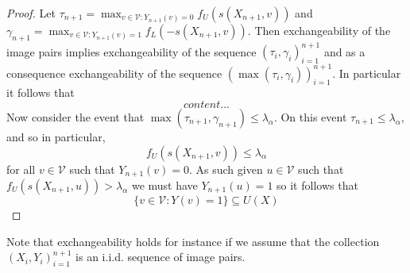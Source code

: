 \begin{proof}
	Let $\tau_{n+1}= \max_{v \in \mathcal{V}: Y_{n+1}(v) = 0} f_U(s(X_{n+1},v))$ and $\gamma_{n+1} = \max_{v \in \mathcal{V}: Y_{n+1}(v) = 1} f_L(-s(X_{n+1},v))$. Then exchangeability of the image pairs implies exchangeability of the sequence $(\tau_i, \gamma_i)_{i = 1}^{n+1}$ and as a consequence exchangeability of the sequence $(\max(\tau_i, \gamma_i))_{i = 1}^{n+1}$. 
	In particular it follows that 
	\begin{equation*}
		content...
	\end{equation*}
	Now consider the event that $\max(\tau_{n+1}, \gamma_{n+1}) \leq \lambda_{\alpha}$. On this event $\tau_{n+1} \leq \lambda_\alpha$, and so in particular, 
	\begin{equation*}
		f_U(s(X_{n+1},v)) \leq \lambda_\alpha 
	\end{equation*}
	for all $v \in \mathcal{V}$ such that $Y_{n+1}(v) = 0$. As such given $u \in \mathcal{V}$ such that $	f_U(s(X_{n+1},u)) > \lambda_\alpha$ we must have $Y_{n+1}(u) = 1$ so it follows that 
	\begin{equation*}
		\lbrace v\in \mathcal{V}: Y(v) = 1 \rbrace \subseteq U(X) 
	\end{equation*}
\end{proof}

\begin{remark}
	Note that exchangeability holds for instance if we assume that the collection $(X_i, Y_i)_{i = 1}^{n+1}$ is an i.i.d. sequence of image pairs.
\end{remark}

